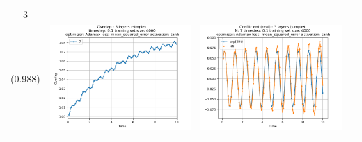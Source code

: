 \documentclass{article}
\begin{document}
\begin{tabular}{|c|c|c|c|}
     3 \\ (0.988) &
     \includegraphics[scale=0.37]{./3_layers_simple_train_samples=4000_timestep=0.1_t_total=10.0_optimizer=Adamax_loss=mean_squared_error_activation=tanh/Overlap.png} &
     \includegraphics[scale=0.37]{./3_layers_simple_train_samples=4000_timestep=0.1_t_total=10.0_optimizer=Adamax_loss=mean_squared_error_activation=tanh/Coeff_N=7_(real).png} &

\end{tabular}
\end{document}
